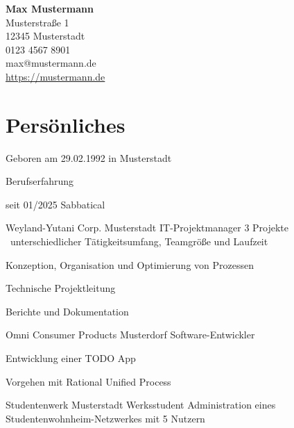 \documentclass{germancv}
\begin{document}
\begin{flushright}
  \textbf{\large Max Mustermann}\\
  Musterstraße 1\\
  12345 Musterstadt\\
  0123 4567 8901\\
  max@mustermann.de\\
  \url{https://mustermann.de}\\
\end{flushright}

\vspace{3em}

\section*{Persönliches}

Geboren am 29.02.1992 in Musterstadt

\begin{cvsection}{Berufserfahrung}
  \begin{cvitembold}
      {seit 01/2025}
    Sabbatical
  \end{cvitembold}
  \begin{cvitemlist}
      {}
      {Weyland-Yutani Corp.}
      {Musterstadt}
      {IT-Projektmanager}
      {3 Projekte \textendash\ unterschiedlicher Tätigkeitsumfang, Teamgröße und Laufzeit}
    \item Konzeption, Organisation und Optimierung von Prozessen
    \item Technische Projektleitung
    \item Berichte und Dokumentation
  \end{cvitemlist}
  \begin{cvitemlist}
      {}
      {Omni Consumer Products}
      {Musterdorf}
      {Software-Entwickler}
      {}
    \item Entwicklung einer TODO App
    \item Vorgehen mit Rational Unified Process
  \end{cvitemlist}
  \begin{cvitem}
      {}
      {Studentenwerk}
      {Musterstadt}
      {Werksstudent}
      {Administration eines Studentenwohnheim-Netzwerkes mit 5 Nutzern}
  \end{cvitem}
\end{cvsection}
\end{document}
